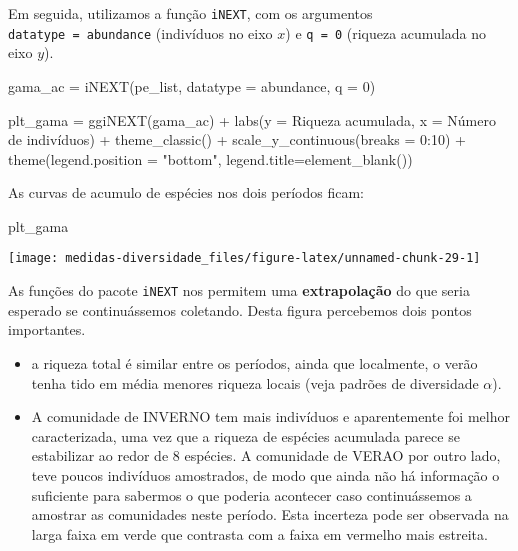 \documentclass[
]{book}
\newenvironment{Shaded}{\begin{snugshade}}{\end{snugshade}}
\newcommand{\AttributeTok}[1]{\textcolor[rgb]{0.77,0.63,0.00}{#1}}
\newcommand{\DecValTok}[1]{\textcolor[rgb]{0.00,0.00,0.81}{#1}}
\newcommand{\FunctionTok}[1]{\textcolor[rgb]{0.00,0.00,0.00}{#1}}
\newcommand{\NormalTok}[1]{#1}
\newcommand{\OtherTok}[1]{\textcolor[rgb]{0.56,0.35,0.01}{#1}}
\newcommand{\SpecialCharTok}[1]{\textcolor[rgb]{0.00,0.00,0.00}{#1}}
\newcommand{\StringTok}[1]{\textcolor[rgb]{0.31,0.60,0.02}{#1}}
\begin{document}
Em seguida, utilizamos a função \texttt{iNEXT}, com os argumentos \texttt{datatype\ =\ \textquotesingle{}abundance\textquotesingle{}} (indivíduos no eixo \(x\)) e \texttt{q\ =\ 0} (riqueza acumulada no eixo \(y\)).

\begin{Shaded}
\begin{Highlighting}[]
\NormalTok{gama\_ac }\OtherTok{=} \FunctionTok{iNEXT}\NormalTok{(pe\_list, }
                 \AttributeTok{datatype =} \StringTok{\textquotesingle{}abundance\textquotesingle{}}\NormalTok{, }
                 \AttributeTok{q =} \DecValTok{0}\NormalTok{)}

\NormalTok{plt\_gama }\OtherTok{=} \FunctionTok{ggiNEXT}\NormalTok{(gama\_ac) }\SpecialCharTok{+}
  \FunctionTok{labs}\NormalTok{(}\AttributeTok{y =} \StringTok{\textquotesingle{}Riqueza acumulada\textquotesingle{}}\NormalTok{,}
       \AttributeTok{x =} \StringTok{\textquotesingle{}Número de indivíduos\textquotesingle{}}\NormalTok{) }\SpecialCharTok{+}
  \FunctionTok{theme\_classic}\NormalTok{() }\SpecialCharTok{+}
  \FunctionTok{scale\_y\_continuous}\NormalTok{(}\AttributeTok{breaks =} \DecValTok{0}\SpecialCharTok{:}\DecValTok{10}\NormalTok{) }\SpecialCharTok{+}
  \FunctionTok{theme}\NormalTok{(}\AttributeTok{legend.position =} \StringTok{"bottom"}\NormalTok{, }
        \AttributeTok{legend.title=}\FunctionTok{element\_blank}\NormalTok{())}
\end{Highlighting}
\end{Shaded}

As curvas de acumulo de espécies nos dois períodos ficam:

\begin{Shaded}
\begin{Highlighting}[]
\NormalTok{plt\_gama}
\end{Highlighting}
\end{Shaded}

\begin{center}\texttt{[image: medidas-diversidade\_files/figure-latex/unnamed-chunk-29-1]} \end{center}

As funções do pacote \texttt{iNEXT} nos permitem uma \textbf{extrapolação} do que seria esperado se continuássemos coletando. Desta figura percebemos dois pontos importantes.

\begin{itemize}
\item
  a riqueza total é similar entre os períodos, ainda que localmente, o verão tenha tido em média menores riqueza locais (veja padrões de diversidade \(\alpha\)).
\item
  A comunidade de INVERNO tem mais indivíduos e aparentemente foi melhor caracterizada, uma vez que a riqueza de espécies acumulada parece se estabilizar ao redor de 8 espécies. A comunidade de VERAO por outro lado, teve poucos indivíduos amostrados, de modo que ainda não há informação o suficiente para sabermos o que poderia acontecer caso continuássemos a amostrar as comunidades neste período. Esta incerteza pode ser observada na larga faixa em verde que contrasta com a faixa em vermelho mais estreita.
\end{itemize}
\end{document}
